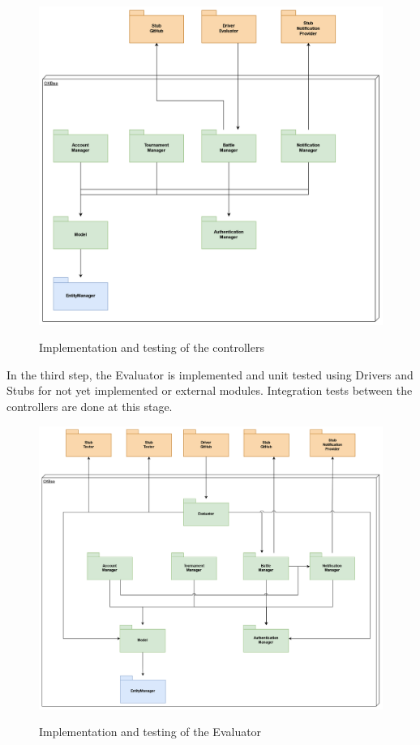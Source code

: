 \documentclass{Configuration_Files/Template}
\begin{document}
\begin{figure}[H]
\centering
\includegraphics[scale = 0.65]{Images/diagrams/ImplementationPlan_SS_Second.png}\\
\caption{Implementation and testing of the controllers}
\end{figure}

In the third step, the Evaluator is implemented and unit tested using Drivers and Stubs for not yet implemented or external modules. Integration tests between the controllers are done at this stage.

\begin{figure}[H]
\centering
\includegraphics[scale = 0.55]{Images/diagrams/ImplementationPlan_SS_Third.png}\\
\caption{Implementation and testing of the Evaluator}
\end{figure}
\end{document}
